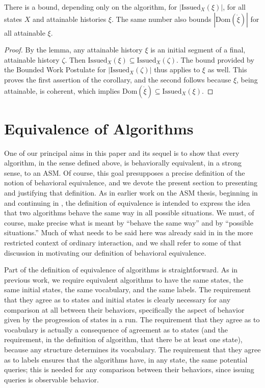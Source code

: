 \documentclass{LMCS}
\theoremstyle{definition}
\newcommand{\ans}{\dot}
\newcommand{\dom}[1]{\ensuremath{{\text{Dom}}(#1)}}
\newcommand{\Issued}{\text{Issued}}
\begin{document}
\begin{cor}  \label{bd-dom}
  There is a bound, depending only on the algorithm, for
    $|\Issued_X(\xi)|$, for all states $X$ and attainable
    histories $\xi$.  The same number also bounds $|\dom{\ans\xi}|$ for all
    attainable $\xi$.
\end{cor}

\begin{proof}
  By the lemma, any attainable history $\xi$ is an initial segment of
  a final, attainable history $\zeta$.  Then $\Issued_X(\xi)
  \subseteq \Issued_X(\zeta)$.  The bound provided by the
  Bounded Work Postulate for $|\Issued_X(\zeta)|$ thus applies
  to $\xi$ as well.  This proves the first assertion of the corollary,
  and the second follows because $\xi$, being attainable, is coherent,
  which implies $\dom{\ans\xi}\subseteq\Issued_X(\xi)$.
\end{proof}



\section{Equivalence of Algorithms}\label{equiv}

One of our principal aims in this paper and its sequel \cite{ga2} is
to show that every algorithm, in the sense defined above, is
behaviorally equivalent, in a strong sense, to an ASM.  Of course,
this goal presupposes a precise definition of the notion of behavioral
equivalence, and we devote the present section to presenting and
justifying that definition.  As in earlier work on the ASM thesis,
beginning in \cite{seqth} and continuing in \cite{parth, oa1, oa2,
  oa3}, the definition of equivalence is intended to express the idea
that two algorithms behave the same way in all possible situations.
We must, of course, make precise what is meant by ``behave the same
way'' and by ``possible situations.''  Much of what needs to be said
here was already said in \cite[Section~6]{oa1} in the more restricted
context of ordinary interaction, and we shall refer to some of that
discussion in motivating our definition of behavioral equivalence.

Part of the definition of equivalence of algorithms is
straightforward.  As in previous work, we require equivalent
algorithms to have the same states, the same initial states, the same
vocabulary, and the same labels.  The requirement that they agree as
to states and initial states is clearly necessary for any comparison
at all between their behaviors, specifically the aspect of behavior
given by the progression of states in a run.  The requirement that
they agree as to vocabulary is actually a consequence of agreement as
to states (and the requirement, in the definition of algorithm, that
there be at least one state), because any structure determines its
vocabulary.  The requirement that they agree as to labels ensures that
the algorithms have, in any state, the same potential queries; this is
needed for any comparison between their behaviors, since issuing
queries is observable behavior.
\end{document}
